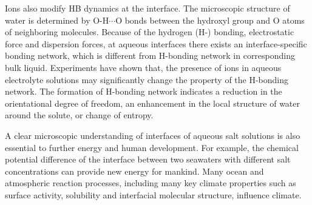 Ions also modify HB dynamics at the interface\cite{Raymond2004,McLain2006,Ball2008}.
The microscopic structure of water is determined by O-H$\cdots$O bonds between the hydroxyl group 
and O atoms of neighboring molecules. 
Because of the hydrogen (H-) bonding, electrostatic force and dispersion forces, 
at aqueous interfaces there exists an interface-specific bonding network\cite{Eisenberg1969,Speedy1976,Poole1994,Soper2008b,Ball2001,Nilsson2011,Pettersson2015}, 
which is different from H-bonding network in corresponding bulk liquid\cite{Allongue96,Velasco-Velez14}.
Experiments have shown that, the presence of ions in aqueous 
electrolyte solutions may significantly change the property of the H-bonding network. 
The formation of H-bonding network indicates a reduction in the orientational degree of freedom, 
an enhancement in the local structure of water around the solute, or change of entropy\cite{Frank45a, Frank45b,Frank45c}.
%


A clear microscopic understanding of interfaces of aqueous salt solutions is also essential to further energy and human development. 
For example, the chemical potential difference of the interface between two seawaters with different salt concentrations can provide new energy for mankind\cite{Pattle1954,Loeb1976}. 
Many ocean and atmospheric reaction processes, including many key climate properties such as surface activity, 
solubility and interfacial molecular structure, influence climate\cite{Schill2015,Cochran2017}. 


